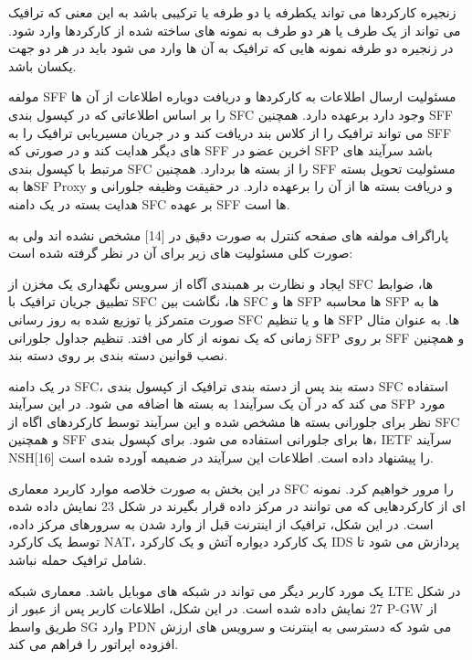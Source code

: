 زنجیره کارکردها می تواند یکطرفه یا دو طرفه یا ترکیبی باشد به این معنی که ترافیک می تواند از یک طرف یا هر دو طرف به نمونه های ساخته شده از کارکردها وارد شود. در زنجیره دو طرفه نمونه هایی که ترافیک به آن ها وارد می شود باید در هر دو جهت یکسان باشد.


مولفه SFF مسئولیت ارسال اطلاعات به کارکردها و دریافت دوباره اطلاعات از آن ها را بر اساس اطلاعاتی که در کپسول بندی SFC وجود دارد برعهده دارد. همچنین SFF می تواند ترافیک را از کلاس بند دریافت کند و در جریان مسیریابی ترافیک را به SFF های دیگر هدایت کند و در صورتی که SFF اخرین عضو در SFP باشد سرآیند های مرتبط با کپسول بندی SFC را از بسته ها بردارد. همچنین SFF مسئولیت تحویل بسته ها بهSF Proxy و دریافت بسته ها از آن را برعهده دارد. در حقیقت وظیفه جلورانی و هدایت بسته در یک دامنه SFC بر عهده SFF ها است.


پاراگراف{}
 مولفه های صفحه کنترل به صورت دقیق در [14] مشخص نشده اند ولی به صورت کلی مسئولیت های زیر برای آن در نظر گرفته شده است:


 ایجاد و نظارت بر همبندی آگاه از سرویس
 نگهداری یک مخزن از SFC ها، ضوابط تطبیق جریان ترافیک با SFC ها، نگاشت بین SFC ها و SFP ها
 محاسبه SFP ها به صورت متمرکز یا توزیع شده
 به روز رسانی SFC ها و یا تنظیم SFP ها. به عنوان مثال زمانی که یک نمونه از کار می افتد.
 تنظیم جداول جلورانی SFP بر روی SFF و همچنین نصب قوانین دسته بندی بر روی دسته بند.



در یک دامنه SFC، دسته بند پس از دسته بندی ترافیک از کپسول بندی SFC استفاده می کند که در آن یک سرآیند1 به بسته ها اضافه می شود. در این سرآیند SFP مورد نظر برای جلورانی بسته ها مشخص شده و این سرآیند توسط کارکردهای اگاه از SFC و همچنین SFF ها برای جلورانی استفاده می شود. برای کپسول بندی، IETF سرآیند NSH[16] را پیشنهاد داده است. اطلاعات این سرآیند در ضمیمه آورده شده است.


در این بخش به صورت خلاصه موارد کاربرد معماری SFC را مرور خواهیم کرد. نمونه ای از کارکردهایی که می توانند در مرکز داده قرار بگیرند در شکل 23 نمایش داده شده است. در این شکل، ترافیک از اینترنت قبل از وارد شدن به سرورهای مرکز داده، توسط یک کارکرد NAT، یک کارکرد دیواره آتش و یک کارکرد IDS پردازش می شود تا شامل ترافیک حمله نباشد.

یک مورد کاربر دیگر می تواند در شبکه های موبایل باشد. معماری شبکه LTE در شکل 27  نمایش داده شده است. در این شکل، اطلاعات کاربر پس از عبور از P-GW از طریق واسط SG وارد PDN می شود که دسترسی به اینترنت و سرویس های ارزش افزوده اپراتور را فراهم می کند.


